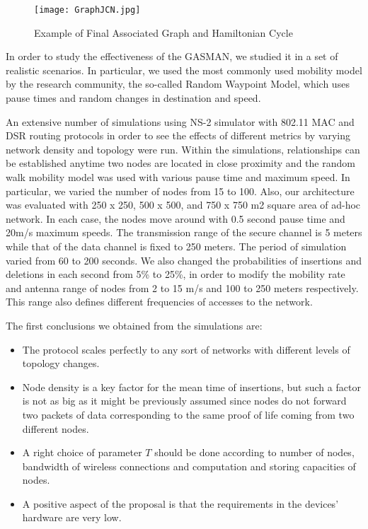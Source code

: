 \documentclass{article}
\begin{document}
\begin{figure}\centering
     \texttt{[image: GraphJCN.jpg]}\caption{Example of Final Associated Graph and Hamiltonian Cycle} \label{fig:Graph}
  \vspace{-0.2cm}
\end{figure}


In order to study the effectiveness of the GASMAN, we studied it in a set of realistic scenarios. In particular, we used the most commonly used mobility model by the research community, the so-called Random Waypoint Model, which uses pause times and random changes in destination and speed.

An extensive number of simulations using NS-2 simulator with 802.11 MAC and DSR
routing protocols in order to see the effects of different metrics by varying network density and topology were run. Within the simulations, relationships can be established anytime two nodes are located in close proximity and the random walk mobility model was used with various pause time and maximum speed. In particular, we varied the number of nodes from 15 to 100. Also, our architecture was evaluated with 250 x 250, 500 x 500, and 750 x 750 m2 square area of ad-hoc network. In each case, the nodes move around with 0.5
second pause time and 20m/s maximum speeds. The transmission range of the
secure channel is 5 meters while that of the data channel is fixed to 250 meters.
The period of simulation varied from 60 to 200 seconds. We also changed the
probabilities of insertions and deletions in each second from 5\%
to 25\%, in order to modify the mobility rate and antenna range of
nodes from 2 to 15 m/s and 100 to 250 meters respectively. This
range also defines different frequencies of accesses to the
network.

The first conclusions we obtained from the simulations
are:
\begin{itemize}
\item The  protocol  scales perfectly to any sort of networks with different levels of topology changes.
\item Node density is a key factor for the mean time of insertions, but such a factor is not as big as it might be
 previously assumed since nodes do not forward two packets of data corresponding to the same proof of life
 coming from two different nodes.
\item A right choice of parameter $T$ should be done according to number of nodes, bandwidth of wireless connections and
computation and storing capacities of nodes.
\item  A positive aspect of the proposal is that the requirements in the devices' hardware are very low.
\end{itemize}
\end{document}
